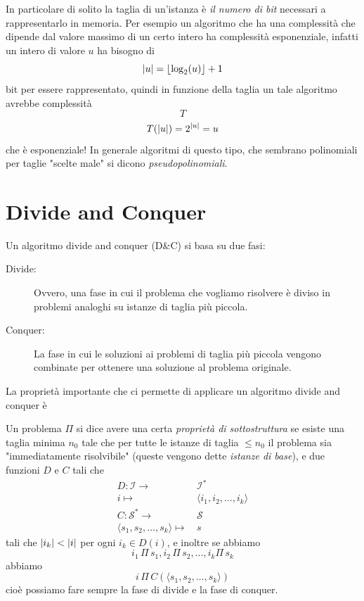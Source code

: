 \documentclass[11pt]{scrartcl}
\begin{document}
	In particolare di solito la taglia di un'istanza è \textit{il numero di bit} necessari a rappresentarlo in memoria. Per esempio un algoritmo che ha una complessità che dipende dal valore massimo di un certo intero ha complessità esponenziale, infatti un intero di valore $u$ ha bisogno di 
	$$\left\lvert u \right\rvert=\left\lfloor \log_2(u) \right\rfloor+1$$
	bit per essere rappresentato, quindi in funzione della taglia un tale algoritmo avrebbe complessità
	$$T$$
	$$T(\left\lvert u \right\rvert)=2^{\left\lvert u \right\rvert}=u$$
	che è esponenziale! In generale algoritmi di questo tipo, che sembrano polinomiali per taglie "scelte male" si dicono \textit{pseudopolinomiali}.
	
	\newpage
	
	\section{Divide and Conquer}
	
	Un algoritmo divide and conquer (D\&C) si basa su due fasi: 
	\begin{description}
		\item[Divide:] Ovvero, una fase in cui il problema che vogliamo risolvere è diviso in problemi analoghi su istanze di taglia più piccola.
		\item[Conquer:] La fase in cui le soluzioni ai problemi di taglia più piccola vengono combinate per ottenere una soluzione al problema originale.
	\end{description}
	La proprietà importante che ci permette di applicare un algoritmo divide and conquer è
	\begin{definition}
		Un problema $\Pi$ si dice avere una certa \textit{proprietà di sottostruttura} se esiste una taglia minima $n_0$ tale che per tutte le istanze di taglia $\le n_0$ il problema sia "immediatamente risolvibile" (queste vengono dette \textit{istanze di base}), e due funzioni $D$ e $C$ tali che
		\begin{align*}
			D:\mathcal{I}\longrightarrow & \, \mathcal{I}^* \\
			i \longmapsto & \, \langle  i_1,i_2,\dots,i_k\rangle \\
			C:\mathcal{S}^*\longrightarrow & \, \mathcal{S} \\
			\langle s_1,s_2,\dots,s_k \rangle  \longmapsto & \, s
		\end{align*}
		tali che $\left\lvert i_k \right\rvert<\left\lvert i \right\rvert$ per ogni $i_k\in D(i)$, e inoltre se abbiamo 
		$$i_1\,\Pi\,s_1,i_2\,\Pi\,s_2,\dots,i_k\Pi\,s_k$$
		abbiamo
		$$i\,\Pi\,C(\langle s_1,s_2,\dots,s_k\rangle)$$
		cioè possiamo fare sempre la fase di divide e la fase di conquer.
	\end{definition} 
	
\end{document}
